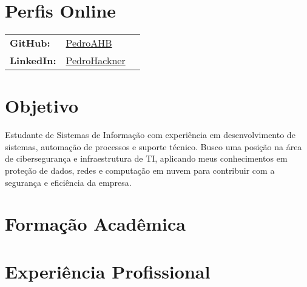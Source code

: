 \documentclass[11pt,a4paper]{moderncv} %
\begin{document}
\maketitle %

\section{Perfis Online}
\begin{tabular}{@{}lll}
    \textbf{GitHub:} & \hspace{0.75cm}\href{https://github.com/PedroAHB}{PedroAHB} & \\
    \textbf{LinkedIn:} & \hspace{0.75cm}\href{https://www.linkedin.com/in/pedrohackner/}{PedroHackner} & \\
\end{tabular}

\section{Objetivo}

\justify Estudante de Sistemas de Informação com experiência em desenvolvimento de sistemas, automação de processos e suporte técnico. Busco uma posição na área de cibersegurança e infraestrutura de TI, aplicando meus conhecimentos em proteção de dados, redes e computação em nuvem para contribuir com a segurança e eficiência da empresa.

\section{Formação Acadêmica}


\section{Experiência Profissional}

\end{document}
